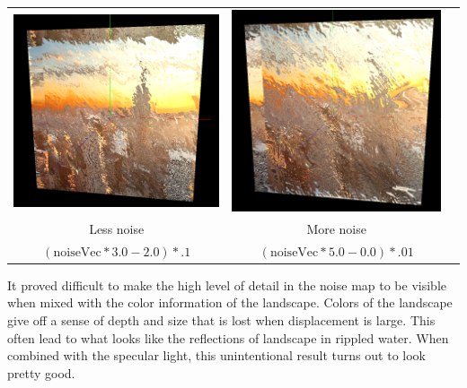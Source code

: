 \documentclass[twoside,11pt]{article}
\theoremstyle{definition}
\begin{document}
\begin{center}\begin{tabular}{ccc}
		\includegraphics[width=.4\textwidth]{less_noise} &
		\includegraphics[width=.4\textwidth]{more_noise}\\
		Less noise & More noise\\
		$(\text{noiseVec} * 3.0 - 2.0) * .1$ & $(\text{noiseVec} * 5.0 - 0.0) * .01$
\end{tabular}\end{center}

It proved difficult to make the high level of detail in the noise map to be visible when mixed with the color information of the landscape. Colors of the landscape give off a sense of depth and size that is lost when displacement is large. This often lead to what looks like the reflections of landscape in rippled water. When combined with the specular light, this unintentional result turns out to look pretty good.
\end{document}

